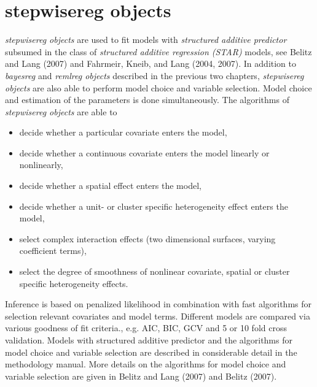 \chapter{stepwisereg objects}
\normalsize
\label{stepwisereg} 

{\em stepwisereg objects} are used to fit models with {\em structured
additive predictor} subsumed in the class of {\em structured
additive regression (STAR)} models, see Belitz and Lang (2007) and
Fahrmeir, Kneib, and Lang (2004, 2007). In addition to {\em bayesreg} and
{\em remlreg objects} described in the previous two chapters, {\em stepwisereg
objects} are also able to perform model choice and variable selection. Model
choice and estimation of the parameters is done simultaneously. The algorithms of {\em stepwisereg objects} are able to
\begin{itemize}
\item decide whether a particular covariate enters the model,
\item decide whether a continuous covariate enters the model linearly or nonlinearly,
\item decide whether a spatial effect enters the model,
\item decide whether a unit- or cluster specific heterogeneity effect enters the model,
\item select complex interaction effects (two dimensional surfaces, varying coefficient terms),
\item select the degree of smoothness of  nonlinear covariate, spatial or cluster specific heterogeneity effects.
\end{itemize}
Inference is based on penalized likelihood in combination with fast algorithms for selection relevant covariates
and model terms. Different models are compared via various goodness of fit criteria., e.g. AIC, BIC,
GCV and 5 or 10 fold cross validation. Models with structured additive predictor and the algorithms for model
choice and variable selection are described in considerable detail in the methodology manual. More details on the
algorithms for model choice and variable selection are given in Belitz and Lang (2007) and Belitz (2007).

     


